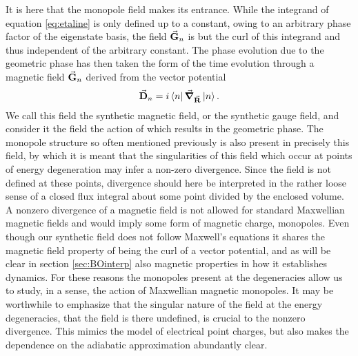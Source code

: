 \documentclass[main.tex]{subfiles}
\begin{document}
It is here that the monopole field makes its entrance. While the integrand of equation
\ref{eq:etaline} is only defined up to a constant, owing to an arbitrary phase factor of
the eigenstate basis, the field \(\va{G}_n\) is but the curl of this integrand and thus
independent of the arbitrary constant. The phase evolution due to the geometric phase has
then taken the form of the time evolution through a magnetic field \(\va{G}_n\) derived
from the vector potential
\begin{align}\label{eq:Dfield}
        \va{D}_n = i\bra{n}\grad_{\va{R}}\ket{n}
.\end{align}
We call this field the synthetic magnetic field, or the synthetic gauge field, and consider
it the field the action of which results in the geometric phase. The monopole
structure so often mentioned previously is also present in precisely this field, by which it is
meant that the singularities of this field which occur at points of energy degeneration may
infer a non-zero divergence. Since the field is not defined at these points, divergence
should here be interpreted in the rather loose sense of a closed flux integral about some
point divided by the enclosed volume. A nonzero divergence of a magnetic field is not allowed for
standard Maxwellian magnetic fields and would imply some form of magnetic charge,
monopoles. Even though our synthetic field does not follow Maxwell's equations it shares
the magnetic field property of being the curl of a vector potential, and as will be clear
in section \ref{sec:BOinterp} also magnetic properties in how it establishes dynamics. For
these reasons the monopoles present at the degeneracies allow us to study, in a sense, the
action of Maxwellian magnetic monopoles. It may be worthwhile to emphasize that the
singular nature of the field at the energy degeneracies, that the field is there undefined,
is crucial to the nonzero divergence. This mimics the model of electrical point charges,
but also makes the dependence on the adiabatic approximation abundantly clear.
\end{document}
